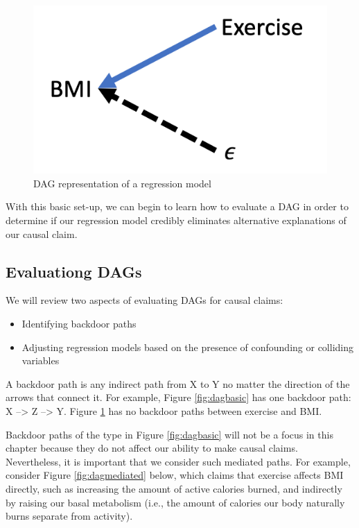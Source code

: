 \documentclass[
]{book}
\providecommand{\tightlist}{%
  \setlength{\itemsep}{0pt}\setlength{\parskip}{0pt}}
\begin{document}
\begin{figure}

{\centering \includegraphics[width=\textwidth]{images/dag_reg} 

}

\caption{DAG representation of a regression model}\label{fig:dagreg}
\end{figure}

With this basic set-up, we can begin to learn how to evaluate a DAG in order to determine if our regression model credibly eliminates alternative explanations of our causal claim.

\hypertarget{evaluationg-dags}{%
\subsection{Evaluationg DAGs}\label{evaluationg-dags}}

We will review two aspects of evaluating DAGs for causal claims:

\begin{itemize}
\tightlist
\item
  Identifying backdoor paths
\item
  Adjusting regression models based on the presence of confounding or colliding variables
\end{itemize}

A backdoor path is any indirect path from X to Y no matter the direction of the arrows that connect it. For example, Figure \ref{fig:dagbasic} has one backdoor path: X --\textgreater{} Z --\textgreater{} Y. Figure \ref{fig:dagreg} has no backdoor paths between exercise and BMI.

Backdoor paths of the type in Figure \ref{fig:dagbasic} will not be a focus in this chapter because they do not affect our ability to make causal claims. Nevertheless, it is important that we consider such mediated paths. For example, consider Figure \ref{fig:dagmediated} below, which claims that exercise affects BMI directly, such as increasing the amount of active calories burned, and indirectly by raising our basal metabolism (i.e., the amount of calories our body naturally burns separate from activity).
\end{document}
